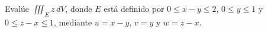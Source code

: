 Evalúe $\iiint_E z\,dV$, donde $E$ está definido por $0\leq x-y\leq2$, $0\leq y\leq1$ y $0\leq z-x\leq1$, mediante $u=x-y$, $v=y$ y $w=z-x$.
